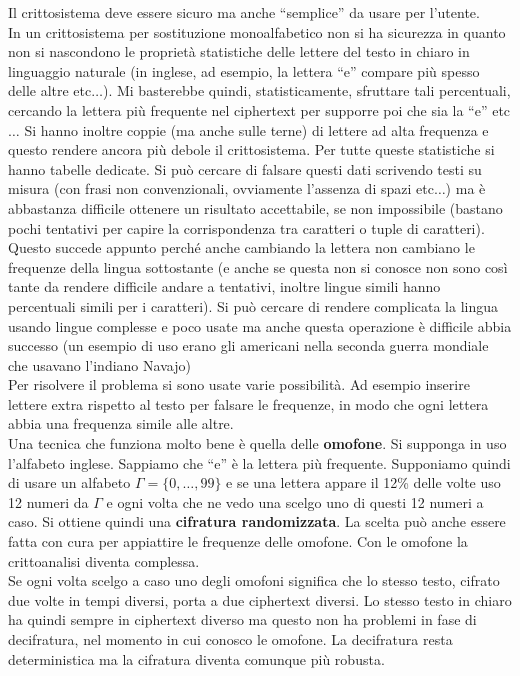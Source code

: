 \documentclass[a4paper,12pt, oneside]{book}
\begin{document}
Il crittosistema deve essere sicuro ma anche ``semplice'' da usare per
l'utente.\\
In un crittosistema per sostituzione monoalfabetico non si ha sicurezza in
quanto non si 
nascondono le proprietà statistiche delle lettere del testo in chiaro in
linguaggio naturale (in inglese, ad esempio, la lettera ``e'' compare più spesso
delle altre etc$\ldots$). Mi basterebbe quindi, statisticamente, sfruttare tali
percentuali, cercando la lettera più frequente nel ciphertext per supporre poi
che sia la ``e'' etc$\ldots$ Si hanno inoltre coppie (ma anche sulle terne) di
lettere ad alta frequenza e questo rendere ancora più debole il
crittosistema. Per tutte queste statistiche si hanno tabelle dedicate. Si può
cercare di falsare questi dati scrivendo testi su misura (con frasi non
convenzionali, ovviamente l'assenza di spazi etc$\ldots$) ma è abbastanza
difficile ottenere un risultato accettabile, se non impossibile (bastano pochi
tentativi per capire la corrispondenza tra caratteri o tuple di
caratteri). Questo succede appunto perché anche cambiando la lettera non
cambiano le frequenze della lingua sottostante (e anche se questa non si conosce
non sono così tante da rendere difficile andare a tentativi, inoltre lingue
simili hanno percentuali simili per i caratteri). Si può cercare di rendere
complicata la lingua usando lingue complesse e poco usate ma anche questa
operazione è difficile abbia successo (un esempio di uso erano gli americani
nella seconda guerra mondiale che usavano l'indiano Navajo)\\
Per risolvere il problema si sono usate varie possibilità. Ad esempio inserire
lettere extra rispetto al testo per falsare le frequenze, in modo che ogni
lettera abbia una frequenza simile alle altre.\\
Una tecnica che funziona molto bene è quella delle \textbf{omofone}. Si
supponga in uso l'alfabeto inglese. Sappiamo che ``e'' è la lettera più
frequente. Supponiamo quindi di usare un alfabeto $\Gamma=\{0,\ldots,99\}$ e se
una lettera appare il 12\% delle volte uso 12 numeri da $\Gamma$ e ogni volta
che ne vedo una scelgo uno di questi 12 numeri a caso. Si ottiene quindi una
\textbf{cifratura randomizzata}. La scelta può anche essere fatta con cura per
appiattire le frequenze delle omofone. Con le omofone la crittoanalisi diventa
complessa.\\
Se ogni volta scelgo a caso uno degli omofoni significa che lo stesso testo,
cifrato due volte in tempi diversi, porta a due ciphertext diversi. Lo stesso
testo in chiaro ha quindi sempre in ciphertext diverso ma questo non ha problemi
in fase di decifratura, nel momento in cui conosco le omofone. La decifratura
resta deterministica ma la cifratura diventa comunque più robusta.
\end{document}
